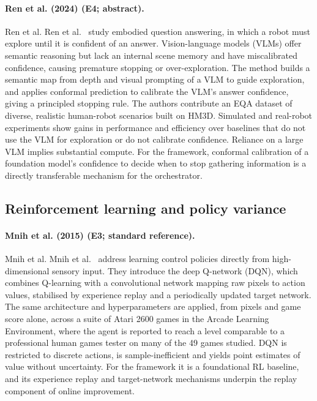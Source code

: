 \documentclass[10pt,a4paper]{article}
\begin{document}
\paragraph{Ren et al. (2024) (E4; abstract).} Ren et al. Ren et al.~\cite{Ren2024} study embodied question answering, in which a robot must explore until it is confident of an answer. Vision-language models (VLMs) offer semantic reasoning but lack an internal scene memory and have miscalibrated confidence, causing premature stopping or over-exploration. The method builds a semantic map from depth and visual prompting of a VLM to guide exploration, and applies conformal prediction to calibrate the VLM's answer confidence, giving a principled stopping rule. The authors contribute an EQA dataset of diverse, realistic human-robot scenarios built on HM3D. Simulated and real-robot experiments show gains in performance and efficiency over baselines that do not use the VLM for exploration or do not calibrate confidence. Reliance on a large VLM implies substantial compute. For the framework, conformal calibration of a foundation model's confidence to decide when to stop gathering information is a directly transferable mechanism for the orchestrator.

\subsection*{Reinforcement learning and policy variance}
\paragraph{Mnih et al. (2015) (E3; standard reference).} Mnih et al. Mnih et al.~\cite{Mnih2015} address learning control policies directly from high-dimensional sensory input. They introduce the deep Q-network (DQN), which combines Q-learning with a convolutional network mapping raw pixels to action values, stabilised by experience replay and a periodically updated target network. The same architecture and hyperparameters are applied, from pixels and game score alone, across a suite of Atari 2600 games in the Arcade Learning Environment, where the agent is reported to reach a level comparable to a professional human games tester on many of the 49 games studied. DQN is restricted to discrete actions, is sample-inefficient and yields point estimates of value without uncertainty. For the framework it is a foundational RL baseline, and its experience replay and target-network mechanisms underpin the replay component of online improvement.
\end{document}
